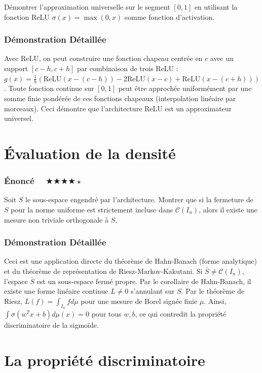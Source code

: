 \documentclass[11pt,a4paper]{article}
\begin{document}
Démontrer l'approximation universelle sur le segment $[0, 1]$ en utilisant la fonction ReLU $\sigma(x) = \max(0, x)$ comme fonction d'activation.

\subsubsection{Démonstration Détaillée}

Avec ReLU, on peut construire une fonction \og chapeau \fg{} centrée en $c$ avec un support $[c-h, c+h]$ par combinaison de trois ReLU : $g(x) = \frac{1}{h} (\text{ReLU}(x - (c-h)) - 2\text{ReLU}(x-c) + \text{ReLU}(x - (c+h)))$. Toute fonction continue sur $[0, 1]$ peut être approchée uniformément par une somme finie pondérée de ces fonctions chapeaux (interpolation linéaire par morceaux). Ceci démontre que l'architecture ReLU est un approximateur universel.


\section{Évaluation de la densité}

\subsubsection{Énoncé $\quad \bigstar\bigstar\bigstar\bigstar\star$}

Soit $S$ le sous-espace engendré par l'architecture. Montrer que si la fermeture de $S$ pour la norme uniforme est strictement incluse dans $\mathcal{C}(I_n)$, alors il existe une mesure non triviale orthogonale à $S$.

\subsubsection{Démonstration Détaillée}

Ceci est une application directe du théorème de Hahn-Banach (forme analytique) et du théorème de représentation de Riesz-Markov-Kakutani. Si $\bar{S} \neq \mathcal{C}(I_n)$, l'espace $\bar{S}$ est un sous-espace fermé propre. Par le corollaire de Hahn-Banach, il existe une forme linéaire continue $L \neq 0$ s'annulant sur $S$. Par le théorème de Riesz, $L(f) = \int_{I_n} f d\mu$ pour une mesure de Borel signée finie $\mu$. Ainsi, $\int \sigma(w^T x + b) d\mu(x) = 0$ pour tous $w, b$, ce qui contredit la propriété discriminatoire de la sigmoïde.


\section{La propriété discriminatoire}
\end{document}
